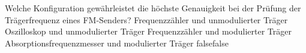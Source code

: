     {Welche Konfiguration gewährleistet die höchste Genauigkeit bei der Prüfung der Trägerfrequenz eines FM-Senders?}
    {Frequenzzähler und unmodulierter Träger}
    {Oszilloskop und unmodulierter Träger}
    {Frequenzzähler und modulierter Träger}
    {Absorptionsfrequenzmesser und modulierter Träger}
    {false}{false}